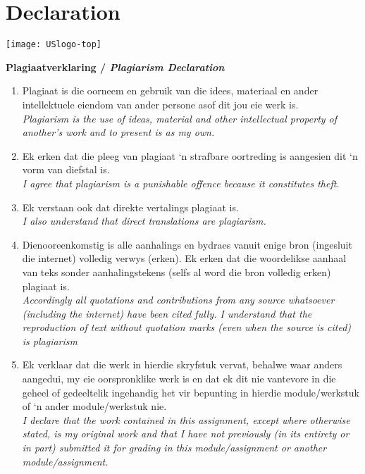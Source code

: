 \chapter*{Declaration}

\begin{center}
    \texttt{[image: USlogo-top]}
    
    {\rmfamily \bfseries \large Plagiaatverklaring / \textit{Plagiarism Declaration} \par}
\end{center}
{\small
\begin{enumerate}[nolistsep]
	\item Plagiaat is die oorneem en gebruik van die idees, materiaal en ander intellektuele eiendom van ander persone asof dit jou eie werk is.\\
	\textit{Plagiarism is the use of ideas, material and other intellectual property of another’s work and to present is as my own.}
	\item Ek erken dat die pleeg van plagiaat `n strafbare oortreding is aangesien dit ‘n vorm van diefstal is.\\
	\textit{I agree that plagiarism is a punishable offence because it constitutes theft.}
	\item Ek verstaan ook dat direkte vertalings plagiaat is. \\
	\textit{I also understand that direct translations are plagiarism.}
	\item Dienooreenkomstig is alle aanhalings en bydraes vanuit enige bron (ingesluit die internet) volledig verwys (erken). Ek erken dat die woordelikse aanhaal van teks sonder aanhalingstekens (selfs al word die bron volledig erken) plagiaat is. \\
	\textit{Accordingly all quotations and contributions from any source whatsoever (including the internet) have been cited fully. I understand that the reproduction of text without quotation marks (even when the source is cited) is plagiarism}
	\item Ek verklaar dat die werk in hierdie skryfstuk vervat, behalwe waar anders aangedui, my eie oorspronklike werk is en dat ek dit nie vantevore in die geheel of gedeeltelik ingehandig het vir bepunting in hierdie module/werkstuk of ‘n ander module/werkstuk nie. \\
	\textit{I declare that the work contained in this assignment, except where otherwise stated, is my original work and that I have not previously (in its entirety or in part) submitted it for grading in this module/assignment or another module/assignment.}
\end{enumerate}
}

